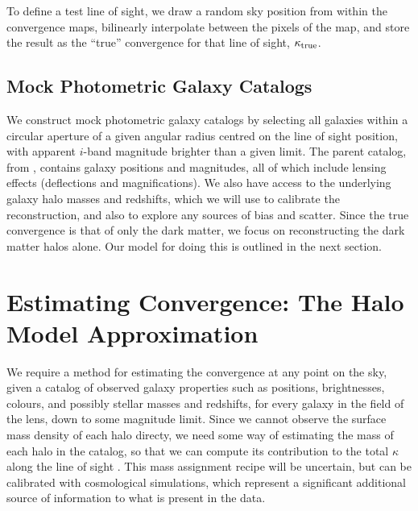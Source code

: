 \documentclass[useAMS,usenatbib]{mn2e}
\begin{document}
To define a test line of sight, we draw a random sky position from
within the convergence maps, bilinearly interpolate between the pixels
of the map, and store the result as the ``true'' convergence for that
line of sight, $\kappa_{\rm true}$. 



\subsection{Mock Photometric Galaxy Catalogs}
\label{sec:MS:mocks}

We construct mock photometric galaxy catalogs by selecting all \MS
galaxies within a circular aperture of a given angular radius centred on
the line of sight position, with apparent $i$-band magnitude brighter
than a given limit. The parent catalog, from \citet{HilbertEtal2011},
contains galaxy positions and magnitudes, all of which include lensing
effects (deflections and magnifications). We also have access to the
underlying galaxy halo masses and redshifts, which we will use to
calibrate the reconstruction, and also to explore any sources of bias
and scatter. Since the true convergence is that of only the dark matter,
we focus on reconstructing the dark matter halos alone. Our model for
doing this is outlined in the next section. 




\section{Estimating Convergence: The Halo Model Approximation}
\label{sec:model}

We require a method for estimating the
convergence at any point on the sky, given a catalog of observed
galaxy properties such as positions, brightnesses, colours, and
possibly stellar masses and redshifts, for every galaxy in the field of
the lens, down to some magnitude limit. Since we cannot observe the
surface mass density of each halo directy, we need some way of
estimating the mass of each halo in the catalog, so that we can compute
its contribution to the total $\kappa$ along the line of sight \citep[as
in \eg][]{GunnarssonEtal2006,WongEtal2011,KarpenkaEtal2012}. 
This mass assignment recipe
will be uncertain, but can be calibrated with cosmological simulations, which
represent a significant additional source of information to what is present in
the data.
\end{document}
